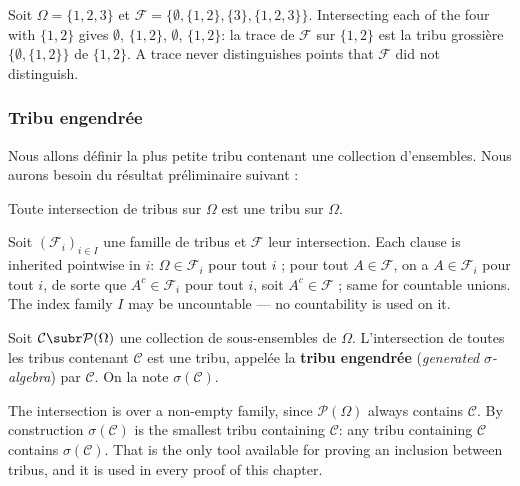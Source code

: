 \begin{example}
  Soit $\Omega = \{1,2,3\}$ et $\mathcal{F} = \{\emptyset, \{1,2\}, \{3\},
  \{1,2,3\}\}$. Intersecting each of the four with $\{1,2\}$ gives $\emptyset$,
  $\{1,2\}$, $\emptyset$, $\{1,2\}$: la trace de $\mathcal{F}$ sur $\{1,2\}$ est la
  tribu grossière $\{\emptyset,\{1,2\}\}$ de $\{1,2\}$. A trace never distinguishes
  points that $\mathcal{F}$ did not distinguish.
\end{example}

\subsubsection{Tribu engendrée}

Nous allons définir la plus petite tribu contenant une collection d'ensembles.
Nous aurons besoin du résultat préliminaire suivant :

\begin{prop}
  Toute intersection de tribus sur $\Omega$ est une tribu sur $\Omega$.
\end{prop}

\begin{remark}
  Soit $(\mathcal{F}_{i})_{i \in I}$ une famille de tribus et $\mathcal{F}$ leur
  intersection. Each clause is inherited pointwise in $i$: $\Omega \in
  \mathcal{F}_{i}$ pour tout $i$ ; pour tout $A \in \mathcal{F}$, on a $A \in
  \mathcal{F}_{i}$ pour tout $i$, de sorte que $A^{c} \in \mathcal{F}_{i}$ pour tout
  $i$, soit $A^{c} \in \mathcal{F}$ ; same for countable unions. The index family
  $I$ may be uncountable --- no countability is used on it.
\end{remark}

\begin{definition}
  Soit $\mathcal{C} \subr \mathcal{P}(\Omega)$ une collection de sous-ensembles de
  $\Omega$. L'intersection de toutes les tribus contenant $\mathcal{C}$ est une
  tribu, appelée la \textbf{tribu engendrée} (\textit{generated $\sigma$-algebra})
  par $\mathcal{C}$. On la note $\sigma(\mathcal{C})$.
\end{definition}

The intersection is over a non-empty family, since $\mathcal{P}(\Omega)$ always
contains $\mathcal{C}$. By construction $\sigma(\mathcal{C})$ is the smallest tribu
containing $\mathcal{C}$: any tribu containing $\mathcal{C}$ contains
$\sigma(\mathcal{C})$. That is the only tool available for proving an inclusion
between tribus, and it is used in every proof of this chapter.

